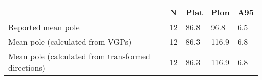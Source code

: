 \begin{tabular}{lllll}
\toprule
{} &   N &  Plat &   Plon &  A95 \\
\midrule
Reported mean pole                                 &  12 &  86.8 &   96.8 &  6.5 \\
Mean pole (calculated from VGPs)                   &  12 &  86.3 &  116.9 &  6.8 \\
Mean pole (calculated from transformed directions) &  12 &  86.3 &  116.9 &  6.8 \\
\bottomrule
\end{tabular}
